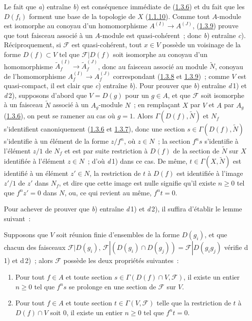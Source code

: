 Le fait que \textit{a}) entraîne \textit{b}) est conséquence immédiate de
(\hyperref[I.1.3.6-fr]{1.3.6}) et du fait que les $D(f_i)$ forment une base
de la topologie de $X$ (\hyperref[I.1.1.10-fr]{1.1.10}). Comme tout
$A$-module est isomorphe au conoyau d'un homomorphisme
$A^{(I)}\to A^{(J)}$, (\hyperref[I.1.3.9-fr]{1.3.9}) prouve que tout faisceau
associé à un $A$-module est quasi-cohérent~; donc \textit{b}) entraîne \textit{c}).
Réciproquement, si $\mathscr{F}$ est quasi-cohérent, tout $x\in V$ possède
un voisinage de la forme $D(f)\subset V$ tel que $\mathscr{F}|D(f)$ soit
isomorphe au conoyau d'un homomorphisme
$\widetilde{A}_f^{(I)}\to\widetilde{A}_f^{(J)}$, donc au faisceau associé au
module $\widetilde{N}$, conoyau de l'homomorphisme
$A_f^{(I)}\to A_f^{(J)}$ correspondant
(\hyperref[I.1.3.8-fr]{1.3.8} et \hyperref[I.1.3.9-fr]{1.3.9})~; comme $V$
est quasi-compact, il est clair que \textit{c}) entraîne \textit{b}).
Pour prouver que \textit{b}) entraîne \textit{d}\,1) et \textit{d}\,2),
supposons d'abord que $V=D(g)$ pour un $g\in A$, et que $\mathscr{F}$ soit
isomorphe à un faisceau $\widetilde{N}$ associé à un $A_g$-module $N$~; en
remplaçant $X$ par $V$ et $A$ par $A_g$
(\hyperref[I.1.3.6-fr]{1.3.6}), on peut se ramener au cas où $g=1$. Alors
$\Gamma(D(f),\widetilde{N})$ et $N_f$ s'identifient canoniquement
(\hyperref[I.1.3.6-fr]{1.3.6} et \hyperref[I.1.3.7-fr]{1.3.7}), donc une
section $s\in\Gamma(D(f),\widetilde{N})$ s'identifie à un élément de la
forme $z/f^n$, où $z\in N$~; la section $f^n s$ s'identifie à l'élément
$z/1$ de $N_f$ et est par suite restriction à $D(f)$ de la section de
$\widetilde{N}$ sur $X$ identifiée à l'élément $z\in N$~; d'où
\textit{d}\,1) dans ce cas. De même, $t\in\Gamma(X,\widetilde{N})$ est
identifié à un élément $z'\in N$, la restriction de $t$ à $D(f)$ est
identifiée à l'image $z'/1$ de $z'$ dans $N_f$, et dire que cette image est
nulle signifie qu'il existe $n\geq0$ tel que $f^n z'=0$ dans $N$, ou, ce
qui revient au même, $f^n t=0$.

Pour achever de prouver que \textit{b}) entraîne \textit{d}\,1) et
\textit{d}\,2), il suffira d'établir le lemme suivant~:

\begin{lemma}[1.4.1.1]
\label{I.1.4.1.1-fr}
Supposons que $V$ soit réunion finie d'ensembles de la forme $D(g_i)$, et
que chacun des faisceaux $\mathscr{F}|D(g_i)$,
$\mathscr{F}|(D(g_i)\cap D(g_j))=\mathscr{F}|D(g_i g_j)$ vérifie
\textup{d\,1)} et \textup{d\,2)}~; alors $\mathscr{F}$ possède les deux
propriétés suivantes~:
\begin{enumerate}
  \item[\textup{d'\,1)}] Pour tout $f\in A$ et toute section
  $s\in\Gamma(D(f)\cap V,\mathscr{F})$, il existe un entier $n\geq0$ tel
  que $f^n s$ se prolonge en une section de $\mathscr{F}$ sur $V$.
  \item[\textup{d'\,2)}] Pour tout $f\in A$ et toute section
  $t\in\Gamma(V,\mathscr{F})$ telle que la restriction de $t$ à
  $D(f)\cap V$ soit $0$, il existe un entier $n\geq0$ tel que $f^n t=0$.
\end{enumerate}
\end{lemma}

